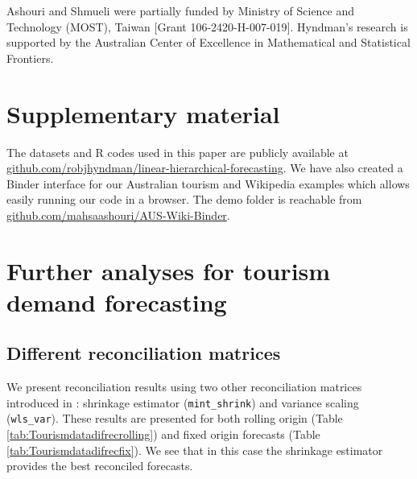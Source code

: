 \documentclass[11pt,a4paper,]{article}
\begin{document}
Ashouri and Shmueli were partially funded by Ministry of Science and Technology (MOST), Taiwan {[}Grant 106-2420-H-007-019{]}. Hyndman's research is supported by the Australian Center of Excellence in Mathematical and Statistical Frontiers.

\hypertarget{supplementary-material}{%
\section*{Supplementary material}\label{supplementary-material}}

The datasets and R codes used in this paper are publicly available at \url{github.com/robjhyndman/linear-hierarchical-forecasting}. We have also created a Binder interface for our Australian tourism and Wikipedia examples which allows easily running our code in a browser. The demo folder is reachable from \url{github.com/mahsaashouri/AUS-Wiki-Binder}.

\clearpage

\hypertarget{appendix-appendix}{%
\appendix}


\hypertarget{further-analyses-for-tourism-demand-forecasting}{%
\section{Further analyses for tourism demand forecasting}\label{further-analyses-for-tourism-demand-forecasting}}

\hypertarget{different-reconciliation-matrices}{%
\subsection{Different reconciliation matrices}\label{different-reconciliation-matrices}}

We present reconciliation results using two other reconciliation matrices introduced in \autocite{mint2018}: shrinkage estimator (\texttt{mint\_shrink}) and variance scaling (\texttt{wls\_var}). These results are presented for both rolling origin (Table \ref{tab:Tourismdatadifrecrolling}) and fixed origin forecasts (Table \ref{tab:Tourismdatadifrecfix}). We see that in this case the shrinkage estimator provides the best reconciled forecasts.
\end{document}
